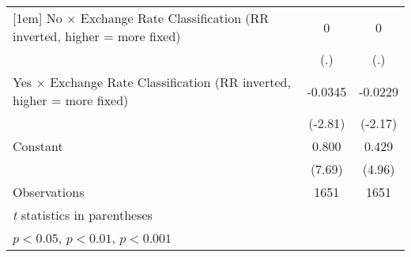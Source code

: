 {\begin{tabular*}{\linewidth}{@{\hskip\tabcolsep\extracolsep\fill}l*{2}{c}}
[1em]
No $\times$ Exchange Rate Classification (RR inverted, higher = more fixed)&        0         &        0         \\
                &      (.)         &      (.)         \\
[1em]
Yes $\times$ Exchange Rate Classification (RR inverted, higher = more fixed)&  -0.0345\sym{**} &  -0.0229\sym{*}  \\
                &  (-2.81)         &  (-2.17)         \\
[1em]
Constant        &    0.800\sym{***}&    0.429\sym{***}\\
                &   (7.69)         &   (4.96)         \\
\hline
Observations    &     1651         &     1651         \\
\hline\hline
\multicolumn{3}{l}{\footnotesize \textit{t} statistics in parentheses}\\
\multicolumn{3}{l}{\footnotesize \sym{*} \(p<0.05\), \sym{**} \(p<0.01\), \sym{***} \(p<0.001\)}\\
\end{tabular*}
}
